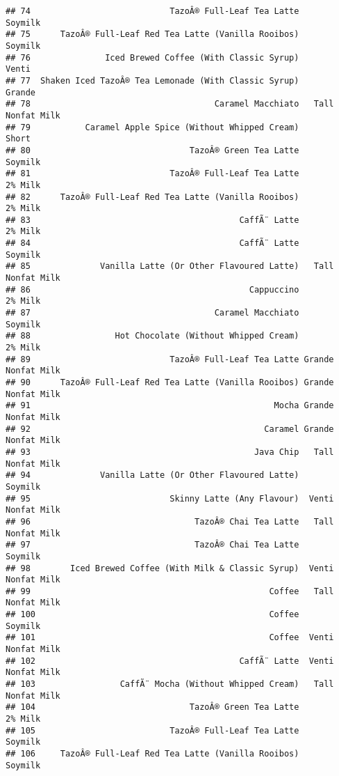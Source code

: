 \documentclass[
]{article}
\begin{document}
\begin{verbatim}
## 74                            TazoÂ® Full-Leaf Tea Latte            Soymilk
## 75      TazoÂ® Full-Leaf Red Tea Latte (Vanilla Rooibos)            Soymilk
## 76               Iced Brewed Coffee (With Classic Syrup)              Venti
## 77  Shaken Iced TazoÂ® Tea Lemonade (With Classic Syrup)             Grande
## 78                                     Caramel Macchiato   Tall Nonfat Milk
## 79           Caramel Apple Spice (Without Whipped Cream)              Short
## 80                                TazoÂ® Green Tea Latte            Soymilk
## 81                            TazoÂ® Full-Leaf Tea Latte            2% Milk
## 82      TazoÂ® Full-Leaf Red Tea Latte (Vanilla Rooibos)            2% Milk
## 83                                          CaffÃ¨ Latte            2% Milk
## 84                                          CaffÃ¨ Latte            Soymilk
## 85              Vanilla Latte (Or Other Flavoured Latte)   Tall Nonfat Milk
## 86                                            Cappuccino            2% Milk
## 87                                     Caramel Macchiato            Soymilk
## 88                 Hot Chocolate (Without Whipped Cream)            2% Milk
## 89                            TazoÂ® Full-Leaf Tea Latte Grande Nonfat Milk
## 90      TazoÂ® Full-Leaf Red Tea Latte (Vanilla Rooibos) Grande Nonfat Milk
## 91                                                 Mocha Grande Nonfat Milk
## 92                                               Caramel Grande Nonfat Milk
## 93                                             Java Chip   Tall Nonfat Milk
## 94              Vanilla Latte (Or Other Flavoured Latte)            Soymilk
## 95                            Skinny Latte (Any Flavour)  Venti Nonfat Milk
## 96                                 TazoÂ® Chai Tea Latte   Tall Nonfat Milk
## 97                                 TazoÂ® Chai Tea Latte            Soymilk
## 98        Iced Brewed Coffee (With Milk & Classic Syrup)  Venti Nonfat Milk
## 99                                                Coffee   Tall Nonfat Milk
## 100                                               Coffee            Soymilk
## 101                                               Coffee  Venti Nonfat Milk
## 102                                         CaffÃ¨ Latte  Venti Nonfat Milk
## 103                 CaffÃ¨ Mocha (Without Whipped Cream)   Tall Nonfat Milk
## 104                               TazoÂ® Green Tea Latte            2% Milk
## 105                           TazoÂ® Full-Leaf Tea Latte            Soymilk
## 106     TazoÂ® Full-Leaf Red Tea Latte (Vanilla Rooibos)            Soymilk

\end{verbatim}
\end{document}
